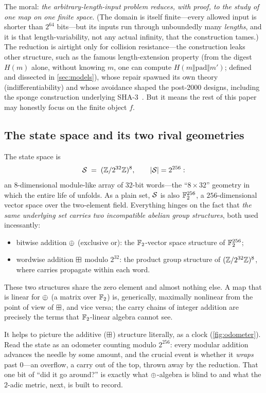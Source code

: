 The moral: \emph{the arbitrary-length-input problem reduces, with proof,
to the study of one map on one finite space}. (The domain is itself
finite---every allowed input is shorter than $2^{64}$ bits---but its
inputs run through unboundedly many \emph{lengths}, and it is that
length-variability, not any actual infinity, that the construction tames.)
The reduction is airtight only for
collision resistance---the construction leaks other structure, such as the
famous length-extension property (from the digest $H(m)$ alone, without
knowing $m$, one can compute $H(m \Vert \mathrm{pad} \Vert m')$; defined
and dissected in \cref{sec:models}), whose repair spawned its own theory
(indifferentiability) and whose avoidance shaped
the post-2000 designs, including the sponge construction underlying
SHA-3~\citep{BDPV2007}. But it means the rest of this paper may honestly
focus on the finite object $f$.

\subsection{The state space and its two rival geometries}
\label{sec:statespace}

The state space is
\[
  \mathcal{S} \;=\; (\mathbb{Z}/2^{32}\mathbb{Z})^{8},
  \qquad |\mathcal{S}| = 2^{256} :
\]
an $8$-dimensional module-like array of $32$-bit words---the
``$8{\times}32$'' geometry in which the entire life of \SHA{} unfolds. As
a plain set, $\mathcal{S}$ is also $\mathbb{F}_2^{256}$, a $256$-dimensional vector
space over the two-element field. Everything hinges on the fact that
\emph{the same underlying set carries two incompatible abelian group
structures}, both used incessantly:
\begin{itemize}
  \item bitwise addition $\oplus$ (exclusive or): the $\mathbb{F}_2$-vector
  space structure of $\mathbb{F}_2^{256}$;
  \item wordwise addition $\boxplus$ modulo $2^{32}$: the product group
  structure of $(\mathbb{Z}/2^{32}\mathbb{Z})^8$, where carries propagate within each word.
\end{itemize}
These two structures share the zero element and almost nothing else. A map
that is linear for $\oplus$ (a matrix over $\mathbb{F}_2$) is, generically,
maximally nonlinear from the point of view of $\boxplus$, and vice versa;
the carry chains of integer addition are precisely the terms that
$\mathbb{F}_2$-linear algebra cannot see.

It helps to picture the additive ($\boxplus$) structure literally, as a
clock (\cref{fig:odometer}). Read the state as an odometer counting
modulo $2^{256}$: every modular addition advances the needle by some
amount, and the crucial event is whether it \emph{wraps} past $0$---an
overflow, a carry out of the top, thrown away by the reduction. That one
bit of ``did it go around?'' is exactly what $\oplus$-algebra is blind to
and what the $2$-adic metric, next, is built to record.

